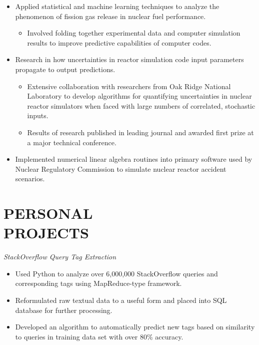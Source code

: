 \documentclass[margin, 10pt]{res} %
\begin{document}
\begin{resume}
\begin{itemize} \itemsep -2pt %
\item Applied statistical and machine learning techniques to analyze the phenomenon of fission gas release in nuclear fuel performance. 
\begin{itemize}
\item Involved folding together experimental data and computer simulation results to improve predictive capabilities of computer codes. 
\end{itemize}
\item Research in how uncertainties in reactor simulation code input parameters propagate to output predictions.
\begin{itemize}
\item Extensive collaboration with researchers from Oak Ridge National Laboratory to develop algorithms for quantifying uncertainties in nuclear reactor simulators when faced with large numbers of correlated, stochastic inputs.
\item Results of research published in leading journal and awarded first prize at a major technical conference.
\end{itemize}
\item Implemented numerical linear algebra routines into primary software used by Nuclear Regulatory Commission to simulate nuclear reactor accident scenarios.
\end{itemize}


\section{PERSONAL \\ PROJECTS}

{\sl StackOverflow Query Tag Extraction} 

\begin{itemize} \itemsep -2pt %
\item Used Python to analyze over 6,000,000 StackOverflow queries and corresponding tags using MapReduce-type framework.  
\item Reformulated raw textual data to a useful form and placed into SQL database for further processing.
\item Developed an algorithm to automatically predict new tags based on similarity to queries in training data set with over 80\% accuracy.
\end{itemize}


\end{resume}
\end{document}
